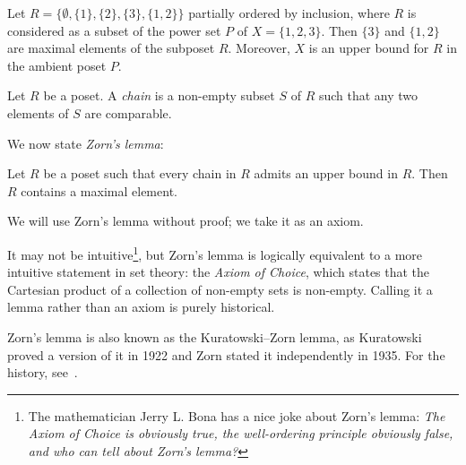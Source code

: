 \begin{example}
    Let $R=\{\emptyset, \{1\},\{2\},\{3\},\{1,2\}\}$ partially ordered by
    inclusion, where $R$ is considered as a subset
    of the power set $P$ of $X=\{1,2,3\}$. 
    Then $\{3\}$ and $\{1,2\}$ are maximal elements of the subposet $R$. Moreover, 
    $X$ is an upper bound for $R$ in the ambient poset $P$. 
\end{example}

\begin{definition}
    Let $R$ be a poset. A \emph{chain} is a non-empty subset $S$ of $R$ such that
    any two elements of $S$ are comparable. 
\end{definition}

We now state \emph{Zorn's lemma}:
\begin{graybox}
\begin{lemma}[Zorn]
Let $R$ be a poset such that 
every chain in $R$ admits an upper bound in $R$. 
Then $R$ contains a maximal element.
\end{lemma}
\end{graybox}

We will use Zorn's lemma without proof; we take it as an axiom.

It may not be intuitive\footnote{The mathematician Jerry L. Bona has a nice
joke about Zorn's lemma: \textit{The Axiom of Choice is obviously true, the
well-ordering principle obviously false, and who can tell about Zorn's
lemma?}}, but Zorn's lemma is logically equivalent to a more intuitive
statement in set theory: the \emph{Axiom of Choice}, which states that the
Cartesian product of a collection of non-empty sets is non-empty. Calling it a
lemma rather than an axiom is purely historical.

Zorn's lemma is also known as the Kuratowski--Zorn lemma, as Kuratowski proved
a version of it in 1922 and Zorn stated it independently in 1935.  For the
history, see~\cite{zbMATH03586974}.


